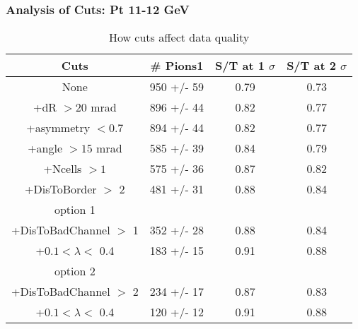 \frame
{
\frametitle{Analysis of Cuts: Pt 11-12 GeV}
\begin{table}
\caption{How cuts affect data quality}
\centering
\begin{tabular}{c c c c}
\hline\hline
Cuts & \# Pions1 & S/T at 1 $\sigma$ & S/T at 2 $\sigma$ \\ [0.5ex]
\hline
None &  950 +/-   59 & 0.79 & 0.73 \\ %
+dR $> 20$ mrad &  896 +/-   44 & 0.82 & 0.77 \\ %
+asymmetry $< 0.7$ &  894 +/-   44 & 0.82 & 0.77 \\ %
+angle $> 15$ mrad &  585 +/-   39 & 0.84 & 0.79 \\ %
+Ncells $> 1$&  575 +/-   36 & 0.87 & 0.82 \\ %
+DisToBorder $>$ 2 &  481 +/-   31 & 0.88 & 0.84 \\ %
option 1\\
+DisToBadChannel $>$ 1&  352 +/-   28 & 0.88 & 0.84 \\ %
+$0.1 < \lambda <$ 0.4 &  183 +/-   15 & 0.91 & 0.88 \\ %
option 2\\
+DisToBadChannel $>$ 2&  234 +/-   17 & 0.87 & 0.83 \\ %
+$0.1 < \lambda <$ 0.4 &  120 +/-   12 & 0.91 & 0.88 \\ %
[1ex]
\hline
\end{tabular}
\label{table:nonlin}
\end{table}
}
